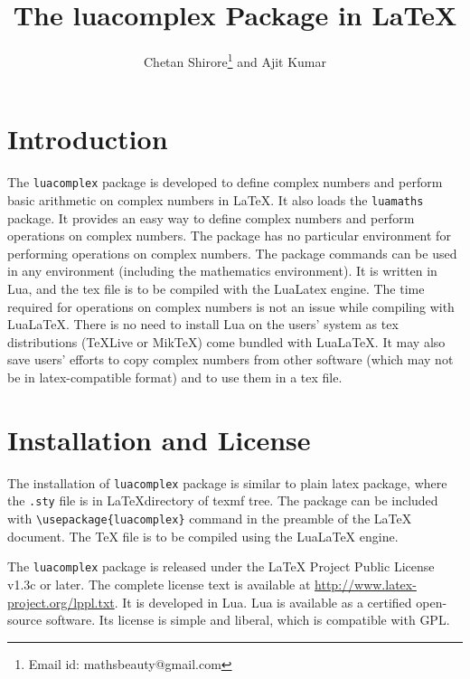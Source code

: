 \documentclass{article}
\begin{document}
\title{The luacomplex Package in LaTeX}
\author{Chetan Shirore\thanks{Email id: mathsbeauty@gmail.com} \space and  Ajit Kumar}
\maketitle
\section{Introduction}\label{section:introduction}
The  \verb|luacomplex| package is developed to define complex numbers and perform basic arithmetic on complex numbers in LaTeX. It also loads the \texttt{luamaths} package. It provides an easy way to define complex numbers and perform operations on complex numbers. The package has no particular environment for performing operations on complex numbers. The package commands can be used in any environment (including the mathematics environment). It is written in Lua, and the tex file is to be compiled with the LuaLatex engine. The time required for operations on complex numbers is not an issue while compiling with LuaLaTeX. There is no need to install Lua on the users' system as tex distributions (TeXLive or MikTeX) come bundled with LuaLaTeX. It may also save users' efforts to copy complex numbers from other software (which may not be in latex-compatible format) and to use them in a tex file. 

\section{Installation and License}

The installation of \verb|luacomplex| package is similar to plain latex package, where the \texttt{.sty} file is in \LaTeX directory of texmf tree. The package can be included with \verb|\usepackage{luacomplex}| command in the preamble of the LaTeX document. The TeX file is to be compiled using the LuaLaTeX engine.

The \verb|luacomplex| package is released under the LaTeX Project Public License v1.3c or later. The complete license text is available at \url{http://www.latex-project.org/lppl.txt}. It is developed in Lua.  Lua is available as a certified open-source software. Its license is simple and liberal, which is compatible with GPL.
\end{document}
